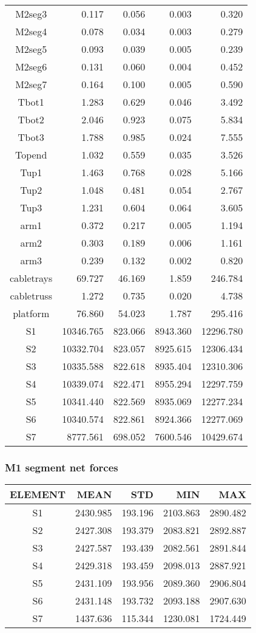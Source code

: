 \begin{longtable}{crrrr}
 M2seg3 & 0.117 & 0.056 & 0.003 & 0.320 \\
 M2seg4 & 0.078 & 0.034 & 0.003 & 0.279 \\
 M2seg5 & 0.093 & 0.039 & 0.005 & 0.239 \\
 M2seg6 & 0.131 & 0.060 & 0.004 & 0.452 \\
 M2seg7 & 0.164 & 0.100 & 0.005 & 0.590 \\
 Tbot1 & 1.283 & 0.629 & 0.046 & 3.492 \\
 Tbot2 & 2.046 & 0.923 & 0.075 & 5.834 \\
 Tbot3 & 1.788 & 0.985 & 0.024 & 7.555 \\
 Topend & 1.032 & 0.559 & 0.035 & 3.526 \\
 Tup1 & 1.463 & 0.768 & 0.028 & 5.166 \\
 Tup2 & 1.048 & 0.481 & 0.054 & 2.767 \\
 Tup3 & 1.231 & 0.604 & 0.064 & 3.605 \\
 arm1 & 0.372 & 0.217 & 0.005 & 1.194 \\
 arm2 & 0.303 & 0.189 & 0.006 & 1.161 \\
 arm3 & 0.239 & 0.132 & 0.002 & 0.820 \\
 cabletrays & 69.727 & 46.169 & 1.859 & 246.784 \\
 cabletruss & 1.272 & 0.735 & 0.020 & 4.738 \\
 platform & 76.860 & 54.023 & 1.787 & 295.416 \\
 S1 & 10346.765 & 823.066 & 8943.360 & 12296.780 \\
 S2 & 10332.704 & 823.057 & 8925.615 & 12306.434 \\
 S3 & 10335.588 & 822.618 & 8935.404 & 12310.306 \\
 S4 & 10339.074 & 822.471 & 8955.294 & 12297.759 \\
 S5 & 10341.440 & 822.569 & 8935.069 & 12277.234 \\
 S6 & 10340.574 & 822.861 & 8924.366 & 12277.069 \\
 S7 & 8777.561 & 698.052 & 7600.546 & 10429.674 \\
\bottomrule
\end{longtable}

\subsubsection{M1 segment net forces}
\begin{longtable}{crrrr}\toprule
 ELEMENT & MEAN & STD & MIN & MAX \\\hline
 S1 & 2430.985 & 193.196 & 2103.863 & 2890.482 \\
 S2 & 2427.308 & 193.379 & 2083.821 & 2892.887 \\
 S3 & 2427.587 & 193.439 & 2082.561 & 2891.844 \\
 S4 & 2429.318 & 193.459 & 2098.013 & 2887.921 \\
 S5 & 2431.109 & 193.956 & 2089.360 & 2906.804 \\
 S6 & 2431.148 & 193.732 & 2093.188 & 2907.630 \\
 S7 & 1437.636 & 115.344 & 1230.081 & 1724.449 \\
\bottomrule
\end{longtable}

